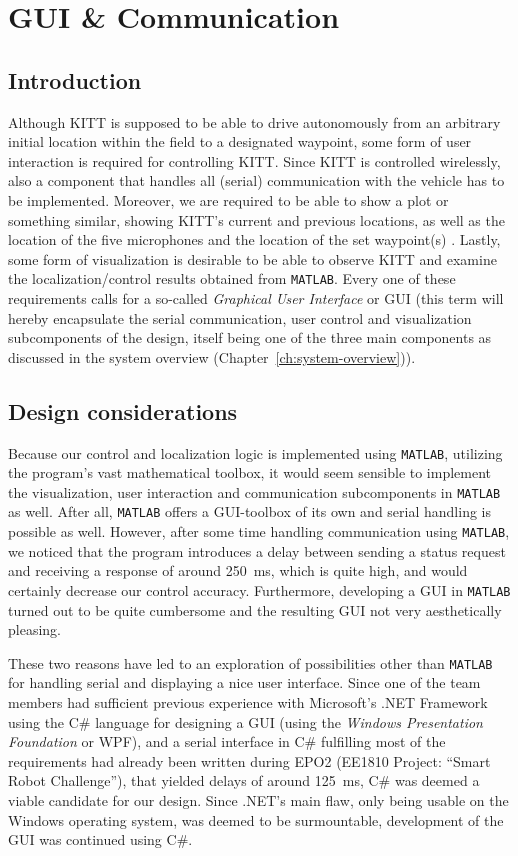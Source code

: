 \documentclass[11pt,titlepage]{report}
\begin{document}
\chapter{GUI \& Communication}
\section{Introduction}
Although KITT is supposed to be able to drive autonomously from an arbitrary initial location within the field to a designated waypoint, some form of user interaction is required for controlling KITT. Since KITT is controlled wirelessly, also a component that handles all (serial) communication with the vehicle has to be implemented. Moreover, we are required to be able to show a plot or something similar, showing KITT's current and previous locations, as well as the location of the five microphones and the location of the set waypoint(s) \cite[114]{epo4-manual}. Lastly, some form of visualization is desirable to be able to observe KITT and examine the localization/control results obtained from \texttt{MATLAB}. Every one of these requirements calls for a so-called \emph{Graphical User Interface} or GUI (this term will hereby encapsulate the serial communication, user control and visualization subcomponents of the design, itself being one of the three main components as discussed in the system overview (Chapter~\ref{ch:system-overview})).

\section{Design considerations}
Because our control and localization logic is implemented using \texttt{MATLAB}, utilizing the program's vast mathematical toolbox, it would seem sensible to implement the visualization, user interaction and communication subcomponents in \texttt{MATLAB} as well. After all, \texttt{MATLAB} offers a GUI-toolbox of its own and serial handling is possible as well. However, after some time handling communication using \texttt{MATLAB}, we noticed that the program introduces a delay between sending a status request and receiving a response of around \SI{250}{ms}, which is quite high, and would certainly decrease our control accuracy. Furthermore, developing a GUI in \texttt{MATLAB} turned out to be quite cumbersome and the resulting GUI not very aesthetically pleasing.

These two reasons have led to an exploration of possibilities other than \texttt{MATLAB} for handling serial and displaying a nice user interface. Since one of the team members had sufficient previous experience with Microsoft's .NET Framework using the C\# language for designing a GUI (using the \emph{Windows Presentation Foundation} or WPF), and a serial interface in C\# fulfilling most of the requirements had already been written during EPO2 (EE1810 Project: ``Smart Robot Challenge''), that yielded delays of around \SI{125}{ms}, C\# was deemed a viable candidate for our design. Since .NET's main flaw, only being usable on the Windows operating system, was deemed to be surmountable, development of the GUI was continued using C\#.
\end{document}
